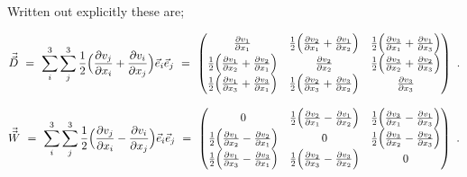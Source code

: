 \documentclass{article}
\begin{document}
Written out explicitly these are; 

\begin{equation} \label{eb-eq-1-111}
\vec{\vec{D}} \hspace{0.125cm} = \hspace{0.125cm} \sum_{i}^{3} \sum_{j}^{3} \frac{1}{2} \Big( \frac{\partial{v_j}}{\partial{x_i}} + \frac{\partial{v_i}}{\partial{x_j}} \Big) \vec{e}_i \vec{e}_j  \hspace{0.125cm} =  \hspace{0.125cm}  \begin{pmatrix} \frac{\partial{v_1}}{\partial{x_1}} & \frac{1}{2} \Big( \frac{\partial{v_2}}{\partial{x_1}} + \frac{\partial{v_1}}{\partial{x_2}} \Big) & \frac{1}{2} \Big( \frac{\partial{v_3}}{\partial{x_1}} + \frac{\partial{v_1}}{\partial{x_3}} \Big) \\ \frac{1}{2} \Big( \frac{\partial{v_1}}{\partial{x_2}} + \frac{\partial{v_2}}{\partial{x_1}}  \Big) & \frac{\partial{v_2}}{\partial{x_2}} & \frac{1}{2} \Big( \frac{\partial{v_3}}{\partial{x_2}} + \frac{\partial{v_2}}{\partial{x_3}} \Big) \\ \frac{1}{2} \Big( \frac{\partial{v_1}}{\partial{x_3}} + \frac{\partial{v_3}}{\partial{x_1}} \Big) & \frac{1}{2} \Big( \frac{\partial{v_2}}{\partial{x_3}} + \frac{\partial{v_3}}{\partial{x_2}} \Big) & \frac{\partial{v_3}}{\partial{x_3}} \end{pmatrix} \hspace{0.125cm} . 
\end{equation} 

\begin{equation} \label{eb-eq-1-112}
\vec{\vec{W}} \hspace{0.125cm} = \hspace{0.125cm} \sum_{i}^{3} \sum_{j}^{3} \frac{1}{2} \Big( \frac{\partial{v_j}}{\partial{x_i}} - \frac{\partial{v_i}}{\partial{x_j}} \Big) \vec{e}_i \vec{e}_j  \hspace{0.125cm} =  \hspace{0.125cm}  \begin{pmatrix} 0 & \frac{1}{2} \Big( \frac{\partial{v_2}}{\partial{x_1}} - \frac{\partial{v_1}}{\partial{x_2}} \Big) & \frac{1}{2} \Big( \frac{\partial{v_3}}{\partial{x_1}} - \frac{\partial{v_1}}{\partial{x_3}} \Big) \\ \frac{1}{2} \Big( \frac{\partial{v_1}}{\partial{x_2}} - \frac{\partial{v_2}}{\partial{x_1}}  \Big) & 0 & \frac{1}{2} \Big( \frac{\partial{v_3}}{\partial{x_2}} - \frac{\partial{v_2}}{\partial{x_3}}  \Big) \\ \frac{1}{2} \Big( \frac{\partial{v_1}}{\partial{x_3}} - \frac{\partial{v_3}}{\partial{x_1}} \Big) & \frac{1}{2} \Big( \frac{\partial{v_2}}{\partial{x_3}} - \frac{\partial{v_3}}{\partial{x_2}} \Big) & 0 \end{pmatrix} \hspace{0.125cm} . 
\end{equation} 
\end{document}
